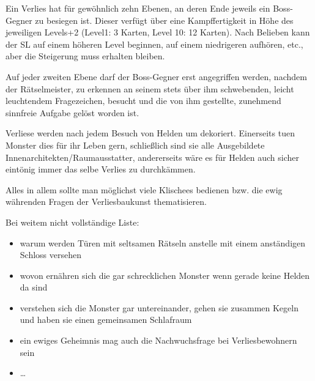 Ein Verlies hat für gewöhnlich zehn Ebenen, an deren Ende jeweils ein Boss-Gegner zu besiegen ist. Dieser verfügt über eine Kampffertigkeit in Höhe des jeweiligen Levels+2 (Level1: 3 Karten, Level 10: 12 Karten). Nach Belieben kann der SL auf einem höheren Level beginnen, auf einem niedrigeren aufhören, etc., aber die Steigerung muss erhalten bleiben.

Auf jeder zweiten Ebene darf der Boss-Gegner erst angegriffen werden, nachdem der Rätselmeister\texttrademark, zu erkennen an seinem stets über ihm schwebenden, leicht leuchtendem Fragezeichen, besucht und die von ihm gestellte, zunehmend sinnfreie Aufgabe gelöst worden ist.

Verliese werden nach jedem Besuch von Helden um dekoriert. Einerseits tuen Monster dies für ihr Leben gern, schließlich sind sie alle Ausgebildete Innenarchitekten/Raumausstatter, andererseits wäre es für Helden auch sicher eintönig immer das selbe Verlies zu durchkämmen.

Alles in allem sollte man möglichst viele Klischees bedienen bzw. die ewig währenden Fragen der Verliesbaukunst thematisieren.

Bei weitem nicht vollständige Liste:
\begin{itemize}
\item warum werden Türen mit seltsamen Rätseln anstelle mit einem anständigen Schloss versehen
\item wovon ernähren sich die gar schrecklichen Monster wenn gerade keine Helden da sind
\item verstehen sich die Monster gar untereinander, gehen sie zusammen Kegeln und haben sie einen gemeinsamen Schlafraum
\item ein ewiges Geheimnis mag auch die Nachwuchsfrage bei Verliesbewohnern sein
\item \dots
\end{itemize}

 


